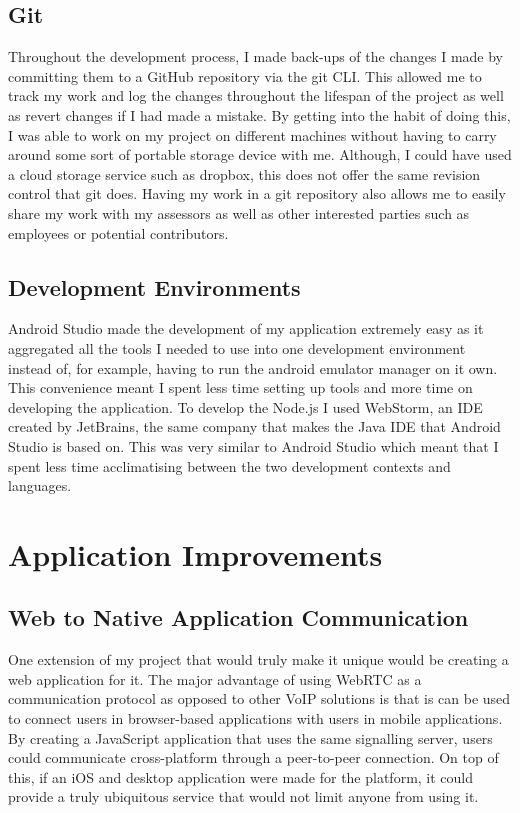 \documentclass[]{report}
\begin{document}
			\subsection{Git}
			Throughout the development process, I made back-ups of the changes I made by committing them to a GitHub repository via the git CLI. This allowed me to track my work and log the changes throughout the lifespan of the project as well as revert changes if I had made a mistake. By getting into the habit of doing this, I was able to work on my project on different machines without having to carry around some sort of portable storage device with me. Although, I could have used a cloud storage service such as dropbox, this does not offer the same revision control that git does. Having my work in a git repository also allows me to easily share my work with my assessors as well as other interested parties such as employees or potential contributors.
			 
			\subsection{Development Environments}
			Android Studio made the development of my application extremely easy as it aggregated all the tools I needed to use into one development environment instead of, for example, having to run the android emulator manager on it own. This convenience meant I spent less time setting up tools and more time on developing the application. To develop the Node.js I used WebStorm, an IDE created by JetBrains, the same company that makes the Java IDE that Android Studio is based on. This was very similar to Android Studio which meant that I spent less time acclimatising between the two development contexts and languages.
			
		\section{Application Improvements}
			\subsection{Web to Native Application Communication}
			One extension of my project that would truly make it unique would be creating a web application for it. The major advantage of using WebRTC as a communication protocol as opposed to other VoIP solutions is that is can be used to connect users in browser-based applications with users in mobile applications. By creating a JavaScript application that uses the same signalling server, users could communicate cross-platform through a peer-to-peer connection. On top of this, if an iOS and desktop application were made for the platform, it could provide a truly ubiquitous service that would not limit anyone from using it.
			
\end{document}
